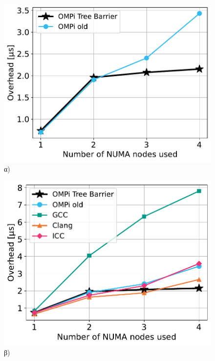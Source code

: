 \begin{figure}[htbp]
    \centering
    \begin{minipage}{0.5\textwidth}
        \centering
        \includegraphics[width=1\textwidth]{Figures/parade-epcc/ompionly_topothreads_tpn-8_spread.pdf}
		α)
    \end{minipage}\hfill
     \begin{minipage}{0.5\textwidth}
        \centering
        \includegraphics[width=1\textwidth]{Figures/parade-epcc/topothreads_tpn-8_spread.pdf}
		β)
    \end{minipage}
    \newline
    \begin{minipage}{0.5\textwidth}

\end{minipage}
\end{figure}

